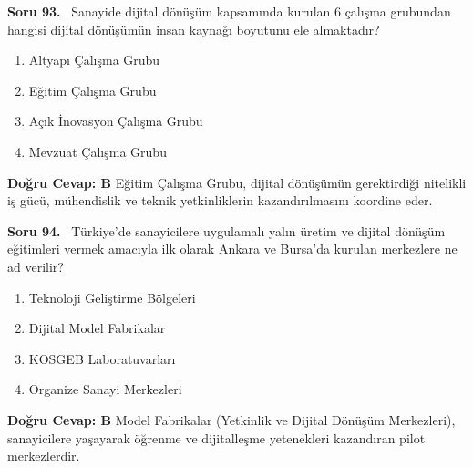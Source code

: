 \documentclass[11pt,a4paper,openany]{book}
\begin{document}
\needspace{5cm}
\vspace{8pt}
\noindent\textbf{\large\sffamily Soru 93.} \ Sanayide dijital dönüşüm kapsamında kurulan 6 çalışma grubundan hangisi dijital dönüşümün insan kaynağı boyutunu ele almaktadır?
\begin{enumerate}[label=\Alph*), leftmargin=25pt, topsep=4pt, itemsep=2pt]
    \item Altyapı Çalışma Grubu
    \item Eğitim Çalışma Grubu
    \item Açık İnovasyon Çalışma Grubu
    \item Mevzuat Çalışma Grubu
\end{enumerate}
\vspace{4pt}
\begin{tcolorbox}[title=Cevap ve Açıklama, colback=gray!3!white, colframe=primarycolor!90!black, arc=2mm, fonttitle=\bfseries\sffamily, top=6pt, bottom=6pt]
    \textbf{Doğru Cevap: B}
    \vspace{2pt}
    Eğitim Çalışma Grubu, dijital dönüşümün gerektirdiği nitelikli iş gücü, mühendislik ve teknik yetkinliklerin kazandırılmasını koordine eder.
\end{tcolorbox}
\vspace{10pt}

\needspace{5cm}
\vspace{8pt}
\noindent\textbf{\large\sffamily Soru 94.} \ Türkiye'de sanayicilere uygulamalı yalın üretim ve dijital dönüşüm eğitimleri vermek amacıyla ilk olarak Ankara ve Bursa'da kurulan merkezlere ne ad verilir?
\begin{enumerate}[label=\Alph*), leftmargin=25pt, topsep=4pt, itemsep=2pt]
    \item Teknoloji Geliştirme Bölgeleri
    \item Dijital Model Fabrikalar
    \item KOSGEB Laboratuvarları
    \item Organize Sanayi Merkezleri
\end{enumerate}
\vspace{4pt}
\begin{tcolorbox}[title=Cevap ve Açıklama, colback=gray!3!white, colframe=primarycolor!90!black, arc=2mm, fonttitle=\bfseries\sffamily, top=6pt, bottom=6pt]
    \textbf{Doğru Cevap: B}
    \vspace{2pt}
    Model Fabrikalar (Yetkinlik ve Dijital Dönüşüm Merkezleri), sanayicilere yaşayarak öğrenme ve dijitalleşme yetenekleri kazandıran pilot merkezlerdir.
\end{tcolorbox}
\vspace{10pt}
\end{document}
